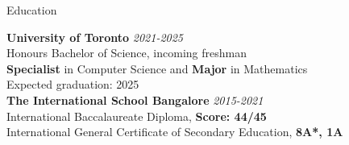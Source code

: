 \documentclass{resume} %
\begin{document}

\begin{rSection}{Education}

{\bf University of Toronto} \hfill {\em 2021-2025} \\ 
Honours Bachelor of Science, incoming freshman \\
\textbf{Specialist} in Computer Science and \textbf{Major} in Mathematics \smallskip \\
Expected graduation: 2025  \\

{\bf The International School Bangalore} \hfill {\em 2015-2021} \\ 
International Baccalaureate Diploma, \textbf{Score: 44/45}  \\
International General Certificate of Secondary Education, \textbf{8A*, 1A}\\

\end{rSection}





\end{document}
